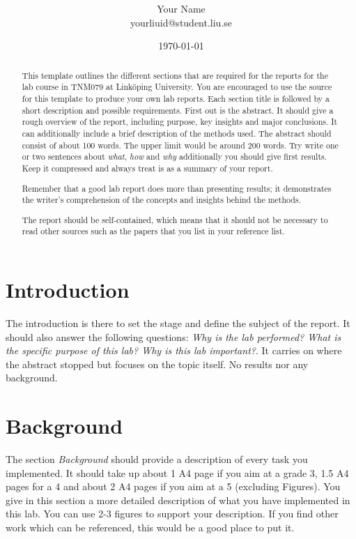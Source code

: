 \documentclass[twocolumn]{article}
\title{\spacecaps{Lab report: Lab 0 }\\ \normalsize \spacesc{TNM079, Modeling and Animation} }
\author{Your Name\\yourliuid@student.liu.se}
\date{\today}
\begin{document}
\maketitle

\begin{abstract}
%
This template outlines the different sections that are required for the reports for the lab course in TNM079 at Link\"oping University. You are encouraged to use the source for this template to produce your own lab reports. Each section title is followed by a short description and possible requirements. First out is the abstract. It should give a rough overview of the report, including purpose, key insights and major conclusions. It can additionally include a brief description of the methods used. The abstract should consist of about 100 words. The upper limit would be around 200 words. Try write one or two sentences about \textit{what}, \textit{how} and \textit{why} additionally you should give first results. Keep it compressed and always treat is as a summary of your report.

Remember that a good lab report does more than presenting results; it demonstrates the writer's comprehension of the concepts and insights behind the methods.

The report should be self-contained, which means that it should not be necessary to read other sources such as the papers that you list in your reference list.
%
\end{abstract}


\section{Introduction}
%
The introduction is there to set the stage and define the subject of the report. It should also answer the following questions: \emph{Why is the lab performed? What is the specific purpose of this lab? Why is this lab important?}. It carries on where the abstract stopped but focuses on the topic itself. No results nor any background.

\section{Background}
%
The section \textit{Background} should provide a description of every task you implemented. It should take up about 1 A4 page if you aim at a grade 3, 1.5 A4 pages for a 4 and about 2 A4 pages if you aim at a 5 (excluding Figures). You give in this section a more detailed description of what you have implemented in this lab. You can use 2-3 figures to support your description. If you find other work which can be referenced, this would be a good place to put it.
\end{document}
